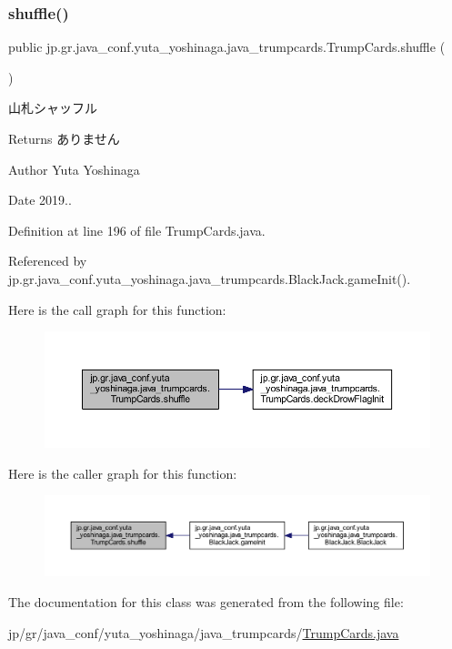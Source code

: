\subsubsection{\texorpdfstring{shuffle()}{shuffle()}}
{\footnotesize\ttfamily public jp.\+gr.\+java\+\_\+conf.\+yuta\+\_\+yoshinaga.\+java\+\_\+trumpcards.\+Trump\+Cards.\+shuffle (\begin{DoxyParamCaption}{ }\end{DoxyParamCaption})}



山札シャッフル 

\begin{DoxyReturn}{Returns}
ありません 
\end{DoxyReturn}
\begin{DoxyAuthor}{Author}
Yuta Yoshinaga 
\end{DoxyAuthor}
\begin{DoxyDate}{Date}
2019.. 
\end{DoxyDate}


Definition at line 196 of file Trump\+Cards.\+java.



Referenced by jp.\+gr.\+java\+\_\+conf.\+yuta\+\_\+yoshinaga.\+java\+\_\+trumpcards.\+Black\+Jack.\+game\+Init().

Here is the call graph for this function\+:
\nopagebreak
\begin{figure}[H]
\begin{center}
\leavevmode
\includegraphics[width=350pt]{classjp_1_1gr_1_1java__conf_1_1yuta__yoshinaga_1_1java__trumpcards_1_1_trump_cards_af1dc4f53d030d1f772c847810e9367fb_cgraph}
\end{center}
\end{figure}
Here is the caller graph for this function\+:
\nopagebreak
\begin{figure}[H]
\begin{center}
\leavevmode
\includegraphics[width=350pt]{classjp_1_1gr_1_1java__conf_1_1yuta__yoshinaga_1_1java__trumpcards_1_1_trump_cards_af1dc4f53d030d1f772c847810e9367fb_icgraph}
\end{center}
\end{figure}


The documentation for this class was generated from the following file\+:\begin{DoxyCompactItemize}
\item 
jp/gr/java\+\_\+conf/yuta\+\_\+yoshinaga/java\+\_\+trumpcards/\hyperlink{_trump_cards_8java}{Trump\+Cards.\+java}\end{DoxyCompactItemize}
